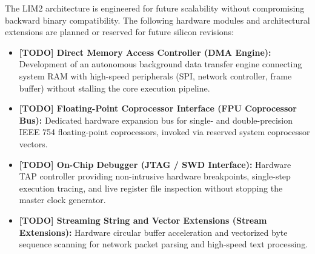 \documentclass[11pt,a4paper]{article}
\begin{document}
The LIM2 architecture is engineered for future scalability without compromising backward binary compatibility. The following hardware modules and architectural extensions are planned or reserved for future silicon revisions:

\begin{archcallout}[title={LIM2 Architectural Extension Roadmap (Revision 2.x / 3.0)}]
\begin{itemize}
    \item \textbf{[TODO] Direct Memory Access Controller (DMA Engine):}
    Development of an autonomous background data transfer engine connecting system RAM with high-speed peripherals (SPI, network controller, frame buffer) without stalling the core execution pipeline.
    \item \textbf{[TODO] Floating-Point Coprocessor Interface (FPU Coprocessor Bus):}
    Dedicated hardware expansion bus for single- and double-precision IEEE 754 floating-point coprocessors, invoked via reserved system coprocessor vectors.
    \item \textbf{[TODO] On-Chip Debugger (JTAG / SWD Interface):}
    Hardware TAP controller providing non-intrusive hardware breakpoints, single-step execution tracing, and live register file inspection without stopping the master clock generator.
    \item \textbf{[TODO] Streaming String and Vector Extensions (Stream Extensions):}
    Hardware circular buffer acceleration and vectorized byte sequence scanning for network packet parsing and high-speed text processing.
\end{itemize}
\end{archcallout}
\end{document}
